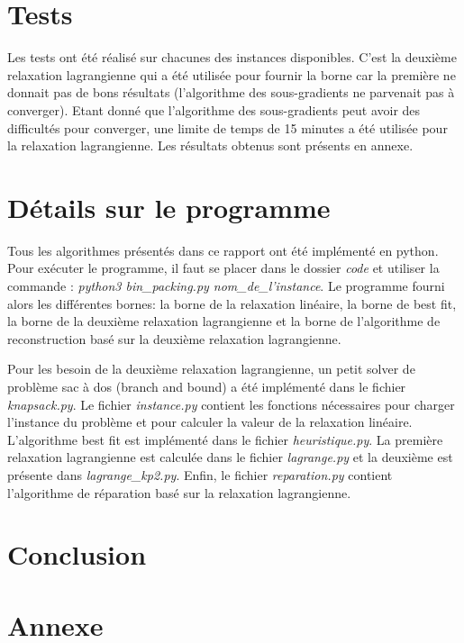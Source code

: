 \documentclass{article}
\begin{document}
\section{Tests}

Les tests ont été réalisé sur chacunes des instances disponibles.
C'est la deuxième relaxation lagrangienne qui a été utilisée pour fournir la borne car la première ne donnait pas de bons résultats (l'algorithme des sous-gradients ne parvenait pas à converger).
Etant donné que l'algorithme des sous-gradients peut avoir des difficultés pour converger, une limite de temps de 15 minutes a été utilisée pour la relaxation lagrangienne.
Les résultats obtenus sont présents en annexe.

\section{Détails sur le programme}

Tous les algorithmes présentés dans ce rapport ont été implémenté en python.
Pour exécuter le programme, il faut se placer dans le dossier \textit{code} et utiliser la commande : \textit{python3 bin\_packing.py nom\_de\_l'instance}.
Le programme fourni alors les différentes bornes: la borne de la relaxation linéaire, la borne de best fit, la borne de la deuxième relaxation lagrangienne et la borne de l'algorithme de reconstruction basé sur la deuxième relaxation lagrangienne.\newline

Pour les besoin de la deuxième relaxation lagrangienne, un petit solver de problème sac à dos (branch and bound) a été implémenté dans le fichier \textit{knapsack.py}.
Le fichier \textit{instance.py} contient les fonctions nécessaires pour charger l'instance du problème et pour calculer la valeur de la relaxation linéaire.
L'algorithme best fit est implémenté dans le fichier \textit{heuristique.py}.
La première relaxation lagrangienne est calculée dans le fichier \textit{lagrange.py} et la deuxième est présente dans \textit{lagrange\_kp2.py}.
Enfin, le fichier \textit{reparation.py} contient l'algorithme de réparation basé sur la relaxation lagrangienne.

\section{Conclusion}

\section{Annexe}
\end{document}
